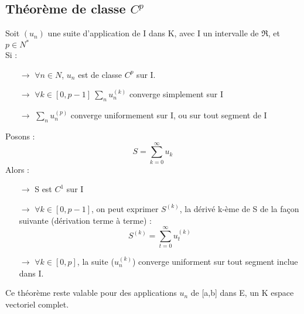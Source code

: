 \subsection{Théorème de classe $C^p$}
\begin{theo}
Soit $(u_n)$ une suite d'application de I dans K, avec I un intervalle de $\Re$, et $p\in N^*$\\
Si : \\
\begin{itemize}
 \item[$\rightarrow$] $\forall n \in N$, $u_n$ est de classe $C^p$ sur I.\\
 \item[$\rightarrow$] $\forall k \in \left[0,p-1\right]~ \underset{n} \sum u^{(k)}_n$ converge simplement sur I \\
 \item[$\rightarrow$] $\underset{n} \sum u^{(p)}_n$ converge uniformement sur I, ou sur tout segment de I \\
\end{itemize}
Posons :
$$S = \sum_{k=0}^{\infty} u_k$$
Alors :\\
\begin{itemize}
 \item[$\rightarrow$] S est $C^1$ sur I\\
 \item[$\rightarrow$] $\forall k \in \left[0,p-1\right]$, on peut exprimer $S^{(k)}$, la dérivé k-ème de S de la façon suivante (dérivation terme à terme) : 
 $$S^{(k)} = \sum_{t=0}^{\infty} u^{(k)}_t$$
 \item[$\rightarrow$] $\forall k \in \left[0,p\right]$, la suite ($u^{(k)}_n$) converge uniforment sur tout segment inclue dans I.
\end{itemize}
\end{theo}
\begin{gene}
Ce théorème reste valable pour des applications $u_n$ de [a,b] dans E, un K espace vectoriel complet.
\end{gene}
